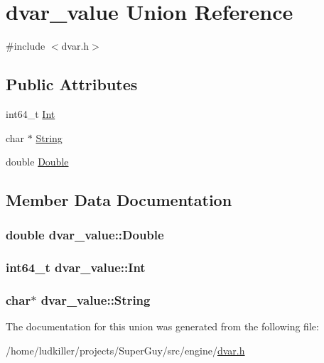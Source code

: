 \hypertarget{uniondvar__value}{\section{dvar\-\_\-value Union Reference}
\label{uniondvar__value}
}


{\ttfamily \#include $<$dvar.\-h$>$}

\subsection*{Public Attributes}
\begin{DoxyCompactItemize}
\item 
int64\-\_\-t \hyperlink{uniondvar__value_aecbfdc802bbab2c898fe8b1c6c7abd08}{Int}
\item 
char $\ast$ \hyperlink{uniondvar__value_aab7b3c8f299e8916451241ede1e7e4f4}{String}
\item 
double \hyperlink{uniondvar__value_a849544de83cf941488aef619c291bb8f}{Double}
\end{DoxyCompactItemize}


\subsection{Member Data Documentation}
\hypertarget{uniondvar__value_a849544de83cf941488aef619c291bb8f}{
\subsubsection[{Double}]{\setlength{\rightskip}{0pt plus 5cm}double dvar\-\_\-value\-::\-Double}}\label{uniondvar__value_a849544de83cf941488aef619c291bb8f}
\hypertarget{uniondvar__value_aecbfdc802bbab2c898fe8b1c6c7abd08}{
\subsubsection[{Int}]{\setlength{\rightskip}{0pt plus 5cm}int64\-\_\-t dvar\-\_\-value\-::\-Int}}\label{uniondvar__value_aecbfdc802bbab2c898fe8b1c6c7abd08}
\hypertarget{uniondvar__value_aab7b3c8f299e8916451241ede1e7e4f4}{
\subsubsection[{String}]{\setlength{\rightskip}{0pt plus 5cm}char$\ast$ dvar\-\_\-value\-::\-String}}\label{uniondvar__value_aab7b3c8f299e8916451241ede1e7e4f4}


The documentation for this union was generated from the following file\-:\begin{DoxyCompactItemize}
\item 
/home/ludkiller/projects/\-Super\-Guy/src/engine/\hyperlink{dvar_8h}{dvar.\-h}\end{DoxyCompactItemize}
